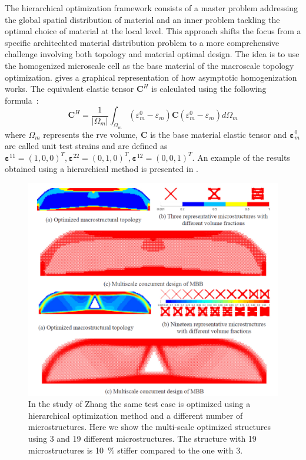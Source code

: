 The hierarchical optimization framework consists of a master problem addressing the global spatial distribution of material and an inner problem tackling the optimal choice of material at the local level. This approach shifts the focus from a specific architechted material distribution problem to a more comprehensive challenge involving both topology and material optimal design. The idea is to use the homogenized microscale cell as the base material of the macroscale topology optimization.  gives a graphical representation of how asymptotic homogenization works. The equivalent elastic tensor $\mathbf{C}^{H}$ is calculated using the following formula~:
\begin{equation}
    \mathbf{C}^{H}=\frac{1}{\left|\Omega_{m}\right|} \int_{\Omega_{m}} \left(\varepsilon_{m}^{0}-\varepsilon_{m}\right)\mathbf{C}\left(\varepsilon_{m}^{0}-\varepsilon_{m}\right) d \Omega_{m}
\end{equation}
where $\Omega_{m}$ represents the \gls{rve} volume, $\mathbf{C}$ is the base material elastic tensor and $\boldsymbol{\varepsilon}_{m}^{0}$ are called unit test strains and are defined as $\boldsymbol{\varepsilon}^{11}=(1,0,0)^{T}, \boldsymbol{\varepsilon}^{22}=(0,1,0)^{T}, \boldsymbol{\varepsilon}^{12}=(0,0,1)^{T}$. An example of the results obtained using a hierarchical method is presented in .
\begin{figure}
    \centering
    \includegraphics[width=0.9\linewidth]{figures/02_literature/top_multiscale.png}
    \caption{In the study of Zhang \etal \cite{zhang_multiscale_2018} the same test case is optimized using a hierarchical optimization method and a different number of microstructures. Here we show the multi-scale optimized structures using 3 and 19 different microstructures. The structure with 19 microstructures is \qty{10}{\percent} stiffer compared to the one with 3.}
    \label{fig:02_hierarchical}
\end{figure}
